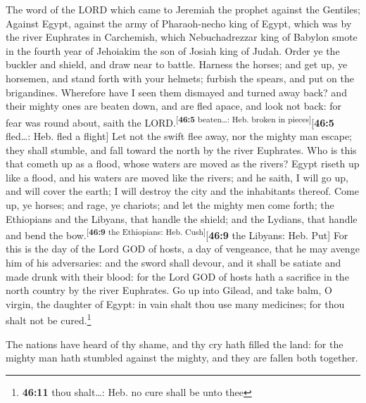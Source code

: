  The word of the LORD which came to Jeremiah the prophet
against the Gentiles;  Against Egypt, against the army of
Pharaoh-necho king of Egypt, which was by the river Euphrates in
Carchemish, which Nebuchadrezzar king of Babylon smote in the fourth
year of Jehoiakim the son of Josiah king of Judah.  Order
ye the buckler and shield, and draw near to battle. 
Harness the horses; and get up, ye horsemen, and stand forth with your
helmets; furbish the spears, and put on the brigandines. 
Wherefore have I seen them dismayed and turned away back? and their
mighty ones are beaten down, and are fled apace, and look not back: for
fear was round about, saith the LORD.\textsuperscript{{[}\textbf{46:5}
beaten\ldots: Heb. broken in pieces{]}}{[}\textbf{46:5} fled\ldots: Heb.
fled a flight{]}  Let not the swift flee away, nor the
mighty man escape; they shall stumble, and fall toward the north by the
river Euphrates.  Who is this that cometh up as a flood,
whose waters are moved as the rivers?  Egypt riseth up
like a flood, and his waters are moved like the rivers; and he saith, I
will go up, and will cover the earth; I will destroy the city and the
inhabitants thereof.  Come up, ye horses; and rage, ye
chariots; and let the mighty men come forth; the Ethiopians and the
Libyans, that handle the shield; and the Lydians, that handle and bend
the bow.\textsuperscript{{[}\textbf{46:9} the Ethiopians: Heb.
Cush{]}}{[}\textbf{46:9} the Libyans: Heb. Put{]}  For
this is the day of the Lord GOD of hosts, a day of vengeance, that he
may avenge him of his adversaries: and the sword shall devour, and it
shall be satiate and made drunk with their blood: for the Lord GOD of
hosts hath a sacrifice in the north country by the river Euphrates.
 Go up into Gilead, and take balm, O virgin, the daughter
of Egypt: in vain shalt thou use many medicines; for thou shalt not be
cured.\footnote{\textbf{46:11} thou shalt\ldots: Heb. no cure shall be
  unto thee}

 The nations have heard of thy shame, and thy cry hath
filled the land: for the mighty man hath stumbled against the mighty,
and they are fallen both together.

